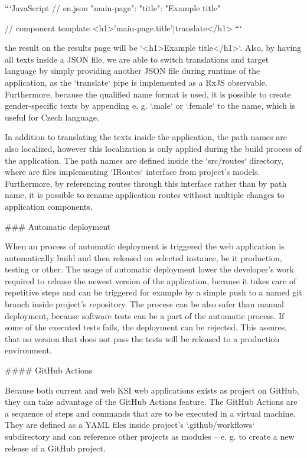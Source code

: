 \documentclass[
  digital, %
  oneside, %
  lof,     %
  lot,     %
]{fithesis4}
\begin{document}
{```JavaScript
// en.json
{
	"main-page": {
		"title": "Example title"
	}
}

// component template
<h1>{{'main-page.title'|translate}}</h1>
```

the result on the results page will be `<h1>Example title</h1>`. Also, by having all texts inside a JSON file, we are able to switch translations and target language by simply providing another JSON file during runtime of the application, as the `translate` pipe is implemented as a RxJS observable. Furthermore, because the qualified name format is used, it is possible to create gender-specific texts by appending e. g. `.male` or `.female` to the name, which is useful for Czech language.

In addition to translating the texts inside the application, the path names are also localized, however this localization is only applied during the build process of the application. The path names are defined inside the `src/routes` directory, where are files implementing `IRoutes` interface from project's models. Furthermore, by referencing routes through this interface rather than by path name, it is possible to rename application routes without multiple changes to application components.

### Automatic deployment
\label{chap:autodeploy}

When an process of automatic deployment is triggered the web application is automatically build and then released on selected instance, be it production, testing or other. The usage of automatic deployment lower the developer's work required to release the newest version of the application, because it takes care of repetitive steps and can be triggered for example by a simple push to a named git branch inside project's repository. The process can be also safer than manual deployment, because software tests can be a part of the automatic process. If some of the executed tests fails, the deployment can be rejected. This assures, that no version that does not pass the tests will be released to a production environment.

#### GitHub Actions

Because both current and web KSI web applications exists as project on GitHub, they can take advantage of the GitHub Actions feature. The GitHub Actions are a sequence of steps and commands that are to be executed in a virtual machine. They are defined as a YAML files inside project's `.github/workflows` subdirectory and can reference other projects as modules -- e. g. to create a new release of a GitHub project.

}
\end{document}
